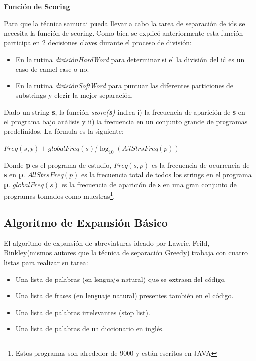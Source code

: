 \documentclass[a4paper,12pt]{report}
\begin{document}
\noindent \textbf{\\\\Función de Scoring}

Para que la técnica samurai pueda llevar a cabo la tarea de separación de ids se necesita la función de scoring. Como bien se explicó anteriormente esta función participa en 2 decisiones claves durante el proceso de división:

\begin{itemize}
\itemsep0em%
\item En la rutina \textit{divisiónHardWord} para determinar si el la división del id es un caso de camel-case o no.

\item En la rutina \textit{divisiónSoftWord} para puntuar las diferentes particiones de substrings y elegir la mejor separación.
\end{itemize}

Dado un string \textbf{s}, la función \textit{score(\textbf{s})} indica i) la frecuencia de aparición de \textbf{s} en el programa bajo análisis y ii) la frecuencia en un conjunto grande de programas predefinidos. La fórmula es la siguiente:

\begin{center}
$Freq(s,p) + globalFreq(s) / \log_{10}(AllStrsFreq(p))$
\end{center}

Donde \textbf{p} es el programa de estudio, $Freq(s,p)$ es la frecuencia de ocurrencia de \textbf{s} en \textbf{p}. $AllStrsFreq(p)$ es la frecuencia total de todos los strings en el programa \textbf{p}. $globalFreq(s)$ es la frecuencia de aparición de \textbf{s} en una gran conjunto de programas tomados como muestras\footnote[1]{Estos programas son alrededor de 9000 y están escritos en JAVA}\cite{EHPV09}.

\pagebreak
\subsection{Algoritmo de Expansión Básico}

El algoritmo de expansión de abreviaturas ideado por Lawrie, Feild, Binkley(mismos autores que la técnica de separación Greedy)\cite{LFBEX07} trabaja con cuatro listas para realizar su tarea:

\begin{itemize}
\itemsep0em%
\item Una lista de palabras (en lenguaje natural) que se extraen del código.
\item Una lista de frases (en lenguaje natural) presentes también en el código.
\item Una lista de palabras irrelevantes (stop list).
\item Una lista de palabras de un diccionario en inglés.
\end{itemize}
\end{document}
